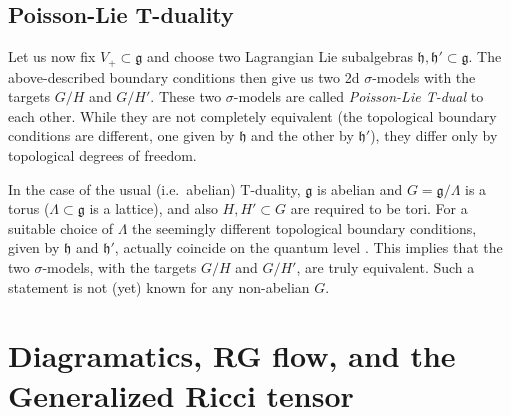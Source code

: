\documentclass[a4paper]{amsart}
\theoremstyle{plain}
\theoremstyle{definition}
\newcommand{\g}{\mathfrak{g}}
\newcommand{\h}{\mathfrak{h}}
\begin{document}
\subsection{Poisson-Lie T-duality}

Let us now fix $V_+\subset\g$ and choose two Lagrangian Lie subalgebras $\h,\h'\subset\g$. The above-described boundary conditions then give us two 2d $\sigma$-models with the targets $G/H$ and $G/H'$. These two $\sigma$-models are called \emph{Poisson-Lie T-dual} \cite{KSe} to each other. While they are not completely equivalent (the topological boundary conditions are different, one given by $\h$ and the other by $\h'$), they differ only by topological degrees of freedom.

In the case of the usual (i.e.\ abelian) T-duality, $\g$ is abelian and $G=\g/\Lambda$ is a torus ($\Lambda\subset\g$ is a lattice), and also $H,H'\subset G$ are required to be tori. For a suitable choice of $\Lambda$ the seemingly different topological boundary conditions, given by $\h$ and $\h'$, actually coincide on the quantum level \cite{KSa}. This implies that the two $\sigma$-models, with the targets $G/H$ and $G/H'$, are truly equivalent. Such a statement is not (yet) known for any non-abelian $G$. 

\section{Diagramatics, RG flow, and the Generalized Ricci tensor}\label{sec:diag}
\end{document}
